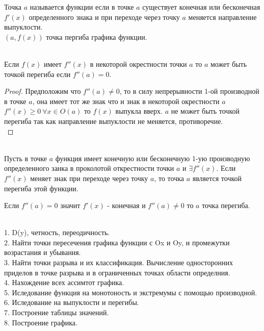 \begin{defin}
  Точка $a$ называется  функции если в точке
  $a$ существует конечная или бесконечная $f'(x)$ определенного знака
  и при переходе через точку $a$ меняется направление выпуклости.\\
  $(a, f(x))$ точка пергиба графика функции.
\end{defin}

\\
Если $f(x)$ имеет $f''(x)$ в некоторой окрестности точки $a$ то $a$ может быть
точкой перегиба если $f''(a) = 0$.\\

\begin{proof}
  Предположим что $f''(a)\not= 0$, то в силу непрерывности 1-ой производной
  в точке $a$, она имеет тот же знак что и знак в некоторой
  окрестности $a$ $f''(x)\ge 0 ~ \forall x\in O(a)$ то $f(x)$ выпукла вверх.
  $a$ не может быть точкой перегиба так как направление выпуклости не меняется,
  противоречие.\\
\end{proof}

\\
Пусть в точке $a$ функция имеет конечную или бесконечную 1-ую производную
определенного занка в проколотой открестности точки $a$ и $\exists f''(x)$.
Если $f''(x)$ меняет знак при переходе через точку $a$, то точка $a$ является
точкой перегиба этой функции.\\

\begin{theorem}
  Если $f''(a) = 0$ значит $f'(x)$ - конечная и $f''(a) \not= 0$ то
  $a$ точка перегиба.\\
\end{theorem}

\\
1. D(y), четность, переодичность.\\
2. Найти точки пересечения графика функции с Ox и Oy, и промежутки возрастания
  и убывания.\\
3. Найти точки разрыва и их классификация. Вычисление односторонних приделов
  в точке разрыва и в ограниченных точках области определния.\\
4. Нахождение всех ассимтот графика.\\
5. Иследование функция на монотоность и экстремумы с помощью производной.\\
6. Иследование на выпуклости и перегибы.\\
7. Построение таблицы значений.\\
8. Построение графика.\\
